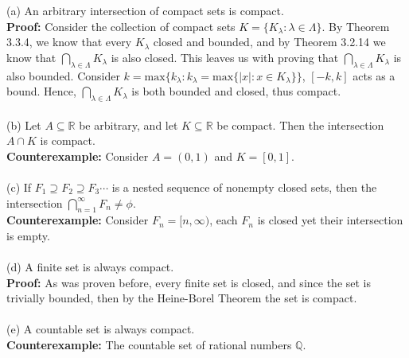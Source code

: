 \documentclass{article}
\begin{document}
\begin{itemize}
	(a) An arbitrary intersection of compact sets is compact. \\
	\textbf{Proof:} Consider the collection of compact sets $K = \{K_\lambda : \lambda \in \Lambda \}$.
	By Theorem 3.3.4, we know that every $K_\lambda$ closed and bounded, and by Theorem 3.2.14 we know that $\bigcap_{\lambda \in \Lambda} K_\lambda$ is also closed. This leaves us with proving that $\bigcap_{\lambda \in \Lambda} K_\lambda$ is also bounded. Consider $k = \text{max}\{k_\lambda : k_\lambda = \text{max}\{|x| : x \in K_\lambda\}\}$, $[-k, k]$ acts as a bound. Hence, $\bigcap_{\lambda \in \Lambda} K_\lambda$ is both bounded and closed, thus compact. \\ \\
	(b) Let $A \subseteq \mathbb{R}$ be arbitrary, and let $K \subseteq \mathbb{R}$ be compact. Then the intersection $A \cap K$ is compact. \\
	\textbf{Counterexample:} Consider $A = (0, 1)$ and $K = [0, 1]$. \\ \\
	(c) If $F_1 \supseteq F_2 \supseteq F_3 \cdots$ is a nested sequence of nonempty closed sets, then the intersection $\bigcap_{n = 1}^\infty F_n \neq \phi$. \\
	\textbf{Counterexample:} Consider $F_n = [n, \infty)$, each $F_n$ is closed yet their intersection is empty. \\ \\
	(d) A finite set is always compact. \\
	\textbf{Proof:} As was proven before, every finite set is closed, and since the set is trivially bounded, then by the Heine-Borel Theorem the set is compact. \\ \\
	(e) A countable set is always compact. \\
	\textbf{Counterexample:} The countable set of rational numbers $\mathbb{Q}$. \\
\end{itemize}
\end{document}
